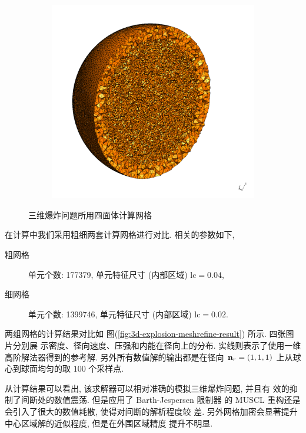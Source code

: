\begin{figure}[htbp]
\begin{subfigure}[b]{0.4\textwidth}
    \includegraphics[scale=0.20]{./Pho/Chp4/3d_explosion_fine_mesh.pdf}
  \end{subfigure}
  \caption{三维爆炸问题所用四面体计算网格}
  \label{fig:3d-explosion-mesh}
\end{figure}
在计算中我们采用粗细两套计算网格进行对比. 相关的参数如下,
\begin{description}
\item[粗网格] 单元个数: 177379, 单元特征尺寸 (内部区域)
  $\mbox{lc} = 0.04$,
\item[细网格] 单元个数: 1399746, 单元特征尺寸 (内部区域)
  $\mbox{lc} = 0.02$.
\end{description}
两组网格的计算结果对比如
图(\ref{fig:3d-explosion-meshrefine-result}) 所示. 四张图片分别展
示密度、径向速度、压强和内能在径向上的分布. 实线则表示了使用一维
高阶解法器得到的参考解. 另外所有数值解的输出都是在径向
${\bf{n}}_{r} = (1,1,1)$ 上从球心到球面均匀的取 $100$ 个采样点.

从计算结果可以看出, 该求解器可以相对准确的模拟三维爆炸问题, 并且有
效的抑制了间断处的数值震荡. 但是应用了 Barth-Jespersen 限制器
的 MUSCL 重构还是会引入了很大的数值耗散, 使得对间断的解析程度较
差. 另外网格加密会显著提升中心区域解的近似程度, 但是在外围区域精度
提升不明显.

